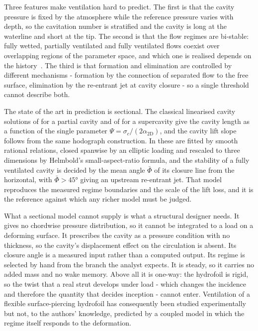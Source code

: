 \documentclass[11pt,a4paper]{article}
\begin{document}
Three features make ventilation hard to predict. The first is that the cavity
pressure is fixed by the atmosphere while the reference pressure varies with
depth, so the cavitation number is stratified and the cavity is long at the
waterline and short at the tip. The second is that the flow regimes are
bi-stable: fully wetted, partially ventilated and fully ventilated flows coexist
over overlapping regions of the parameter space, and which one is realised
depends on the history~\citep{Harwood2016}. The third is that formation and
elimination are controlled by different mechanisms - formation by the connection
of separated flow to the free surface, elimination by the re-entrant jet at
cavity closure - so a single threshold cannot describe both.

The state of the art in prediction is sectional. The classical linearised cavity
solutions of \citet{Acosta1955} for a partial cavity and of \citet{Tulin1953} for
a supercavity give the cavity length as a function of the single parameter
$\Psi = \sigma_c/(2\alpha_{2\mathrm{D}})$, and the cavity lift slope follows from
the same hodograph construction. In \citet{Harwood2016} these are fitted by
smooth rational relations, closed spanwise by an elliptic loading and rescaled to
three dimensions by Helmbold's small-aspect-ratio formula, and the stability of a
fully ventilated cavity is decided by the mean angle $\bar{\Phi}$ of its closure
line from the horizontal, with $\bar{\Phi} > \ang{45}$ giving an upstream
re-entrant jet. That model reproduces the measured regime boundaries and the
scale of the lift loss, and it is the reference against which any richer model
must be judged.

What a sectional model cannot supply is what a structural designer needs. It
gives no chordwise pressure distribution, so it cannot be integrated to a load on
a deforming surface. It prescribes the cavity as a pressure condition with no
thickness, so the cavity's displacement effect on the circulation is absent. Its
closure angle is a measured input rather than a computed output. Its regime is
selected by hand from the branch the analyst expects. It is steady, so it carries
no added mass and no wake memory. Above all it is one-way: the hydrofoil is
rigid, so the twist that a real strut develops under load - which changes the
incidence and therefore the quantity that decides inception - cannot enter.
Ventilation of a flexible surface-piercing hydrofoil has consequently been
studied experimentally~\citep{Harwood2020} but not, to the authors' knowledge,
predicted by a coupled model in which the regime itself responds to the
deformation.
\end{document}
